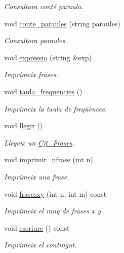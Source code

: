 \begin{DoxyCompactItemize}
\begin{DoxyCompactList}\small\item\em Consultora conté paraula. \end{DoxyCompactList}\item 
void \hyperlink{class_cjt___frases_a14b7023a8d6db200f472c4b24d28ceed}{conte\+\_\+paraules} (string paraules)
\begin{DoxyCompactList}\small\item\em Consultora paraules. \end{DoxyCompactList}\item 
void \hyperlink{class_cjt___frases_a8ea119b6b227b4a00b2084f92f1c2ae2}{expressio} (string \&exp)
\begin{DoxyCompactList}\small\item\em Imprimeix frases. \end{DoxyCompactList}\item 
void \hyperlink{class_cjt___frases_a82810909fda7a0dfa200c595ef57033f}{taula\+\_\+frequencies} ()
\begin{DoxyCompactList}\small\item\em Imprimeix la taula de freqüènces. \end{DoxyCompactList}\item 
void \hyperlink{class_cjt___frases_aedcac1f588f4985043b7fb85087b7c71}{llegir} ()
\begin{DoxyCompactList}\small\item\em Llegeix un \hyperlink{class_cjt___frases}{Cjt\+\_\+\+Frases}. \end{DoxyCompactList}\item 
void \hyperlink{class_cjt___frases_a487b50527aa63fd84f3865712fe694fd}{imprimir\+\_\+nfrase} (int n)
\begin{DoxyCompactList}\small\item\em Imprimeix una frase. \end{DoxyCompactList}\item 
void \hyperlink{class_cjt___frases_adfd3891b0aab6ad19c33c0cfd85fe811}{frasesxy} (int n, int m) const 
\begin{DoxyCompactList}\small\item\em Imprimeix el rang de frases x y. \end{DoxyCompactList}\item 
void \hyperlink{class_cjt___frases_ada8ea95fd9039d2c0d00fd12731f9932}{escriure} () const 
\begin{DoxyCompactList}\small\item\em Imprimeix el contingut. \end{DoxyCompactList}\end{DoxyCompactItemize}
